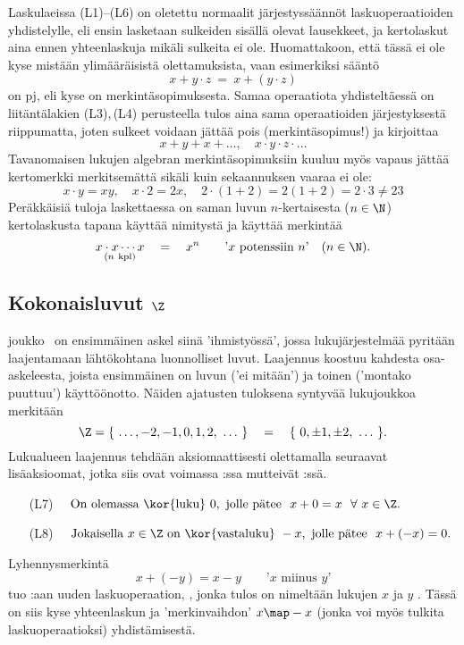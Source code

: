 Laskulaeissa (L1)--(L6) on oletettu normaalit järjestyssäännöt laskuoperaatioiden yhdistelylle,
eli ensin lasketaan sulkeiden sisällä olevat lausekkeet, ja kertolaskut aina ennen yhteenlaskuja
mikäli sulkeita ei ole. Huomattakoon, että tässä ei ole kyse mistään ylimääräisistä 
olettamuksista, vaan esimerkiksi sääntö
\[
x + y \cdot z\ =\ x + (y \cdot z)
\]
on  pj, eli kyse on merkintäsopimuksesta. Samaa operaatiota
yhdisteltäessä on  liitäntälakien (L3),\,(L4) perusteella tulos aina sama operaatioiden järjestyksestä
riippumatta, joten sulkeet voidaan jättää pois (merkintäsopimus!) ja kirjoittaa
\[
x + y + x + \ldots, \quad x \cdot y \cdot z \cdot \ldots
\]
Tavanomaisen lukujen algebran merkintäsopimuksiin kuuluu myös vapaus jättää kertomerkki merkitsemättä
sikäli kuin sekaannuksen vaaraa ei ole:
\[
x \cdot y = xy, \quad x \cdot 2 = 2x, \quad  2\cdot(1+2) = 2(1+2) = 2 \cdot 3 \neq 23
\]
Peräkkäisiä tuloja laskettaessa on saman luvun $n$-kertaisesta ($n \in \N$) kertolaskusta tapana
käyttää nimitystä  ja käyttää merkintää
\[
\underset{(n\ \text{kpl})}{x \cdot x \cdots x} \quad = \quad x^n \quad 
                              \quad \text{'$x$ potenssiin $n$'} \quad (n \in \N).
\]
   
\subsection{Kokonaisluvut $\Z$}

 joukko \Z\ on ensimmäinen askel siinä 'ihmistyössä', jossa 
lukujärjestelmää pyritään laajentamaan lähtökohtana luonnolliset luvut. Laajennus koostuu 
kahdesta osa-askeleesta, joista ensimmäinen on luvun  ('ei mitään') ja toinen 
 ('montako puuttuu') käyttöönotto. Näiden ajatusten tuloksena syntyvää 
lukujoukkoa merkitään
\[
\Z = \{\ \ldots,-2,-1,0,1,2,\ \ldots\ \} \quad = \quad \{\ 0,\pm 1, \pm 2,\ \ldots\ \}.
\]
Lukualueen laajennus tehdään aksiomaattisesti olettamalla seuraavat lisäaksioomat, jotka siis
ovat voimassa \Z:ssa mutteivät \N:ssä.
\begin{itemize}
\item[(L7)] $\quad \text{On olemassa \kor{luku}}\ 0,\ 
                   \text{jolle pätee}\ \ x+0 = x\ \ \forall\ x \in \Z.$
\item[(L8)] $\quad \text{Jokaisella}\ x \in \Z\ \text{on \kor{vastaluku}}\ -x,\ 
                   \text{jolle pätee}\ \ x+(-x) = 0.$
\end{itemize}
Lyhennysmerkintä
\[
x + (-y) = x - y \quad \quad \text{'$x$ miinus $y$'}
\]
tuo \Z:aan uuden laskuoperaation, , jonka tulos on nimeltään lukujen $x$ ja
$y$ .  Tässä on siis kyse yhteenlaskun ja 'merkinvaihdon' $x \map -x$ (jonka voi 
myös tulkita laskuoperaatioksi) yhdistämisestä.

